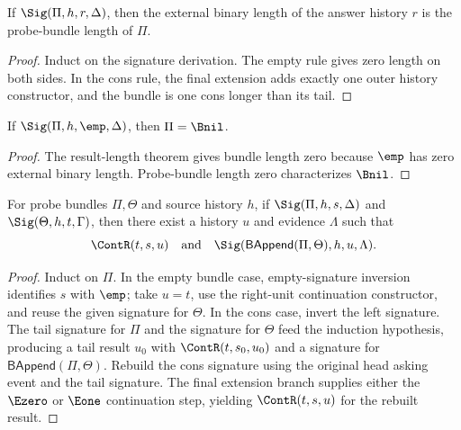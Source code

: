 \begin{theorem}
\label{thm:signature-result-length-bundle-length}
If \(\Sig(\Pi,h,r,\Delta)\), then the external binary length of the answer
history \(r\) is the probe-bundle length of \(\Pi\).
\end{theorem}
\begin{proof}
Induct on the signature derivation. The empty rule gives zero length on both
sides. In the cons rule, the final extension adds exactly one outer history
constructor, and the bundle is one cons longer than its tail.
\end{proof}

\begin{theorem}
\label{thm:signature-empty-result-bundle-nil}
If \(\Sig(\Pi,h,\emp,\Delta)\), then \(\Pi=\Bnil\).
\end{theorem}
\begin{proof}
The result-length theorem gives bundle length zero because \(\emp\) has zero
external binary length. Probe-bundle length zero characterizes \(\Bnil\).
\end{proof}

\begin{theorem}
\label{thm:signature-generation-bundle-append}
For probe bundles $\Pi,\Theta$ and source history $h$, if $\Sig(\Pi,h,s,\Delta)$ and $\Sig(\Theta,h,t,\Gamma)$, then there exist a history $u$ and evidence $\Lambda$ such that
$$
\ContR(t,s,u)
\quad\text{and}\quad
\Sig(\mathsf{BAppend}(\Pi,\Theta),h,u,\Lambda).
$$
\end{theorem}
\begin{proof}
Induct on $\Pi$. In the empty bundle case, empty-signature inversion identifies $s$ with $\emp$; take $u=t$, use the right-unit continuation constructor, and reuse the given signature for $\Theta$. In the cons case, invert the left signature. The tail signature for $\Pi$ and the signature for $\Theta$ feed the induction hypothesis, producing a tail result $u_0$ with $\ContR(t,s_0,u_0)$ and a signature for $\mathsf{BAppend}(\Pi,\Theta)$. Rebuild the cons signature using the original head asking event and the tail signature. The final extension branch supplies either the $\Ezero$ or $\Eone$ continuation step, yielding $\ContR(t,s,u)$ for the rebuilt result.
\end{proof}

